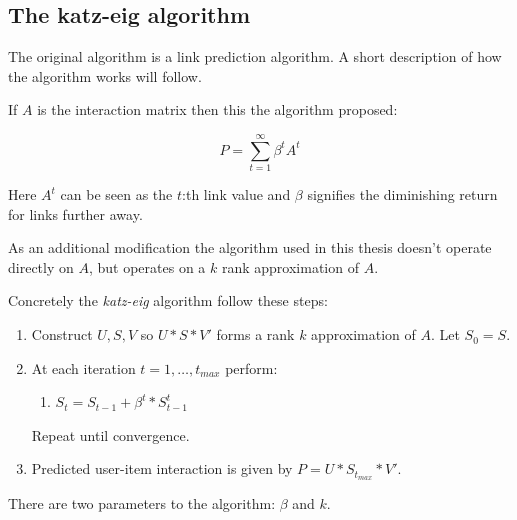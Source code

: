 \subsection{The katz-eig algorithm}\label{sec:background:theory:katzeig}


The original algorithm \cite{katz1953new} is a link prediction algorithm. A short description of how the algorithm works will follow.

If $A$ is the interaction matrix then this the algorithm proposed:

\begin{equation}
    P = \sum_{t=1}^{\infty} \beta^t A^t
\end{equation}

Here $A^t$ can be seen as the $t$:th link value and $\beta$ signifies the diminishing return for links further away.


As an additional modification the algorithm used in this thesis doesn't operate directly on $A$, but operates on a $k$ rank approximation of $A$.


Concretely the \textit{katz-eig} algorithm follow these steps:

\begin{enumerate}
    \item Construct $U, S, V$ so $U * S * V'$ forms a rank $k$ approximation of $A$. Let $S_0 = S$.

    \item At each iteration $t = 1, \ldots, t_{max}$ perform:

        \begin{enumerate}
            \item $S_t = S_{t - 1} + \beta^t * S_{t - 1}^t$
        \end{enumerate}

        Repeat until convergence.

    \item Predicted user-item interaction is given by $P = U * S_{t_{max}} * V'$.

\end{enumerate}

There are two parameters to the algorithm: $\beta$ and $k$.



